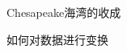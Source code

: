 \documentclass[UTF8]{ctexbeamer}
\begin{document}
\begin{frame}{Chesapeake海湾的收成}
\end{frame}

\begin{frame}{如何对数据进行变换}

  \begin{figure}
    \centering
    \setcounter{subfigure}{0}{}

\end{figure}
\end{frame}
\end{document}
